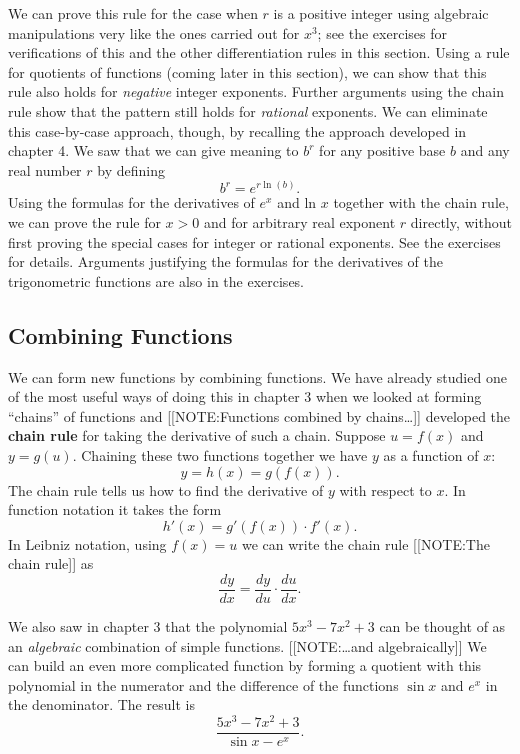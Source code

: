 We can prove this rule for the case when $r$ is a positive integer
using algebraic manipulations very like the ones carried out for
$x^{3}$; see the exercises for verifications of this and the other
differentiation rules in this section. Using a rule for quotients of
functions (coming later in this section), we can show that this rule
also holds for {\em negative\/} integer exponents. Further arguments
using the chain rule show that the pattern still holds for {\em
  rational\/} exponents. We can eliminate this case-by-case approach,
though, by recalling the approach developed in chapter 4.  We saw that
we can give meaning to $b^{r}$ for any positive base $b$ and any real
number $r$ by defining
\[
b^{\textstyle r} = e^{\textstyle r \ln(b)}.
\]
Using the formulas for the derivatives of $e^{\displaystyle x}$ and ln $x$ together with the chain rule, we can prove the rule for $x>0$ and for arbitrary real exponent $r$ directly, without first proving the special cases for integer or rational exponents.  See the exercises for details.  Arguments justifying the formulas for the derivatives of the trigonometric functions are also in the exercises.

\subsection{Combining Functions}
\label{subsec:combining-functions}

	We can form new functions by combining functions.  We have already studied one of the most useful ways of doing this in chapter 3 when we looked at forming ``chains'' of functions and 
	[[NOTE:Functions combined  by chains\ldots]]	
developed the {\bf chain rule} for taking the derivative of such a chain.  Suppose $u=f(x)$ and $y=g(u)$.  Chaining these two functions together we have $y$ as a function of $x$:
\[
y = h(x) = g(f(x)).
\]  
The chain rule tells us how to find the derivative of $y$ with respect to $x$.  In function notation it takes the form
\[
h'(x) = g'(f(x)) \cdot f'(x).
\] 
In Leibniz notation, using $f(x) = u$ we can write the chain rule  
	[[NOTE:The chain rule]]
as
\[
\frac{dy}{dx} = \frac{dy}{du} \cdot \frac{du}{dx}.
\]

	We also saw in chapter 3 that the polynomial $5x^{3}-7x^2 +3$ can be thought of as an {\em algebraic\/} combination of simple functions.   
	[[NOTE:\ldots and algebraically]]	
We can build an even more complicated function by forming a quotient with this polynomial in the numerator and the difference of the functions $\sin{x}$ and $e^x$ in the denominator.  The result is
\[
\frac{5x^{3}-7x^2 +3}{\sin{x} - e^x}.
\]


